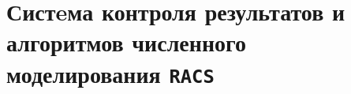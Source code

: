 \documentclass[12pt]{book}
\begin{document}
\chapter{Систeма контроля результатов и алгоритмов численного моделирования {\tt RACS}} 














\end{document}
